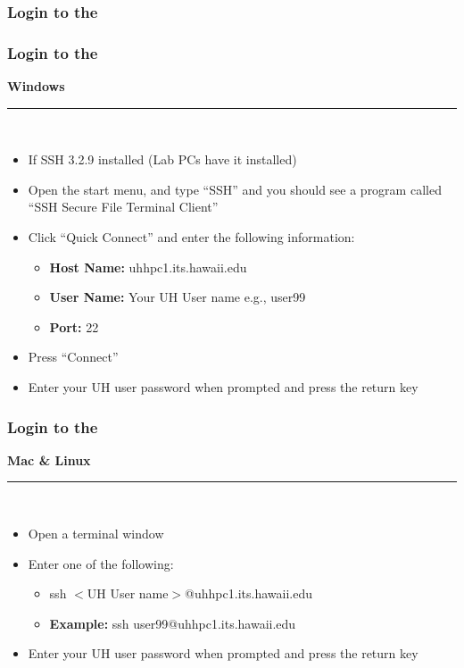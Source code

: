 \subsubsection{Login to the {\craycs}}
\begin{frame}
\frametitle{Login to the {\craycs}}
	\begin{center}\textbf{Windows}\end{center}
	\hrule~\\
	\begin{itemize}
		\item If SSH 3.2.9 installed (Lab PCs have it installed)
		\item Open the start menu, and type ``SSH'' and you should see a program called ``SSH Secure File Terminal Client''
		\item Click ``Quick Connect'' and enter the following information:
			\begin{itemize}
			\item[] \textbf{Host Name:} uhhpc1.its.hawaii.edu %
			\item[] \textbf{User Name:} Your UH User name e.g., user99
			\item[] \textbf{Port:} 22
			\end{itemize}
		\item Press ``Connect''
		\item Enter your UH user password when prompted and press the return key
	\end{itemize}
\end{frame}


\begin{frame}
\frametitle{Login to the {\craycs}}
	\begin{center}\textbf{Mac \& Linux}\end{center}
	\hrule~\\
	\begin{itemize}
		\item Open a terminal window
		\item Enter one of the following:
		\begin{itemize}
			\item ssh $<$UH User name$>$@uhhpc1.its.hawaii.edu
			\item \textbf{Example:} ssh user99@uhhpc1.its.hawaii.edu
		\end{itemize}
		\item Enter your UH user password when prompted and press the return key
	\end{itemize}
\end{frame}


